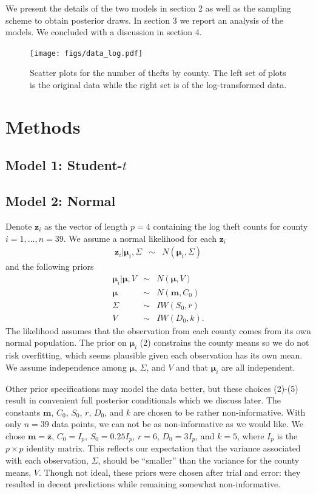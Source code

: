 \documentclass{asaproc}
\newcommand{\m}[1]{\mathbf{\bm{#1}}}
\begin{document}
We present the details of the two models in section 2 as well as the sampling scheme to obtain posterior draws. In section 3 we report an analysis of the models. We concluded with a discussion in section 4.

\begin{figure}[ht]
\centering
\texttt{[image: figs/data\_log.pdf]}
\caption{Scatter plots for the number of thefts by county. The left set of plots is the original data while the right set is of the log-transformed data.}
\label{data}
\end{figure}

\section{Methods}

\subsection{Model 1: Student-$t$}
\subsection{Model 2: Normal}

Denote $\m{z}_i$ as the vector of length $p=4$ containing the log theft counts for county $i=1,\ldots,n=39$. We assume a normal likelihood for each $\m{z}_i$
\begin{eqnarray}
\m{z}_i|\m{\mu}_i,\Sigma &\sim& N(\m{\mu}_i, \Sigma)
\end{eqnarray}
and the following priors
\begin{eqnarray}
\m{\mu}_i|\m{\mu},V &\sim& N(\m{\mu}, V) \\
\m{\mu} &\sim& N(\m{m}, C_0) \\
\Sigma &\sim& IW(S_0, r) \\
V &\sim& IW(D_0, k).
\end{eqnarray}
The likelihood assumes that the observation from each county comes from its own normal population. The prior on $\m{\mu}_i$ (2) constrains the county means so we do not risk overfitting, which seems plausible given each observation has its own mean. We assume independence among $\m{\mu}$, $\Sigma$, and $V$ and that $\m{\mu}_i$ are all independent.

Other prior specifications may model the data better, but these choices (2)-(5) result in convenient full posterior conditionals which we discuss later. The constants $\m{m}$, $C_0$, $S_0$, $r$, $D_0$, and $k$ are chosen to be rather non-informative. With only $n=39$ data points, we can not be as non-informative as we would like. We chose $\m{m}=\bar{\m{z}}$, $C_0=I_p$, $S_0=0.25 I_p$, $r=6$, $D_0=3 I_p$, and $k=5$, where $I_p$ is the $p\times p$ identity matrix. This reflects our expectation that the variance associated with each observation, $\Sigma$, should be ``smaller'' than the variance for the county means, $V$. Though not ideal, these priors were chosen after trial and error: they resulted in decent predictions while remaining somewhat non-informative.
\end{document}
